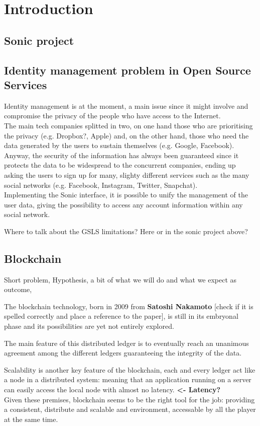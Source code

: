 \section{Introduction}
\label{S:1}

\subsection{Sonic project}

\subsection{Identity management problem in Open Source Services}

Identity management is at the moment, a main issue since it might involve and compromise the privacy of the people who have access to the Internet. 
\\
The main tech companies splitted in two, on one hand those who are prioritising the privacy (e.g. Dropbox?, Apple) and, on the other hand, those who need the data generated by the users to sustain themselves (e.g. Google, Facebook).
\\
Anyway, the security of the information has always been guaranteed since it protects the data to be widespread to the concurrent companies, ending up asking the users to sign up for many, slighty different services such as the many social networks (e.g. Facebook, Instagram, Twitter, Snapchat).
\\
Implementing the Sonic interface, it is possible to unify the management of the user data, giving the possibility to access any account information within any social network.

\begin{answer}
  Where to talk about the GSLS limitations? Here or in the sonic project above?
\end{answer}


\subsection{Blockchain}

Short problem, 
Hypothesis,
a bit of what we will do and what we expect as outcome,

The blockchain technology, born in 2009 from \textbf{Satoshi Nakamoto} [check if it is spelled correctly and place a reference to the paper], is still in its embryonal phase and its possibilities are yet not entirely explored.

The main feature of this distributed ledger is to eventually reach an unanimous agreement among the different ledgers guaranteeing the integrity of the data. 

Scalability is another key feature of the blockchain, each and every ledger act like a node in a distributed system: meaning that an application running on a server can easily access the local node with almost no latency. \textbf{<- Latency? }
\\
Given these premises, blockchain seems to be the right tool for the job: providing a consistent, distribute and scalable and environment, accessable by all the player at the same time.
